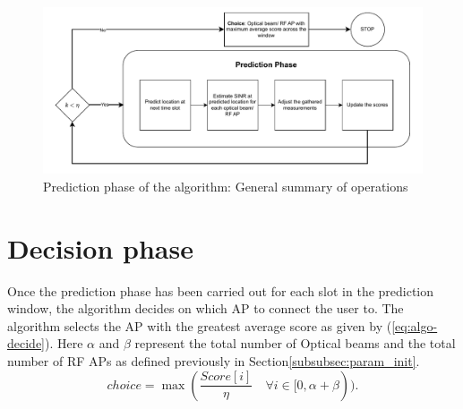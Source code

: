 \begin{figure}
    \centering
    \includegraphics[width=1\linewidth]{Figures/Algorithm-design.drawio.pdf}
    \caption{Prediction phase of the algorithm: General summary of operations}
    \label{fig:algo-prediction}
\end{figure}
\section{Decision phase}
Once the prediction phase has been carried out for each slot in the prediction window, the algorithm decides on which AP to connect the user to. The algorithm selects the AP with the greatest average score as given by (\ref{eq:algo-decide}). Here $\alpha$ and $\beta$ represent the total number of Optical beams and the total number of RF APs as defined previously in Section\ref{subsubsec:param_init}. 
\begin{equation}
        {choice} = \max(\frac{Score[i]}{\eta} \quad \forall i \in [0, \alpha + \beta)).
        \label{eq:algo-decide}
    \end{equation}

